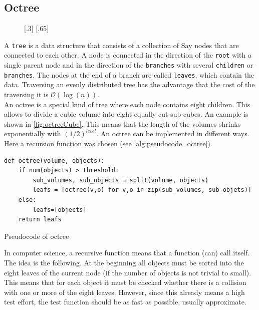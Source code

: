 \subsection{Octree}
% 
\begin{figure}[!t]
    \centering
    [.3\textwidth]{
    \def\tikzheight{0.6\textwidth}
    }
    [.65\textwidth]{
    \def\tikzheight{0.6\textwidth}
    }
	\caption{}
	\label{fig:octree}
\end{figure}
% 
A \texttt{tree} is a data structure that consists of a collection of Say nodes that are connected to each other.
A node is connected in the direction of the \texttt{root} with a single parent node and in the direction of the \texttt{branches} with several \texttt{children} or \texttt{branches}.
The nodes at the end of a branch are called \texttt{leaves}, which contain the data.
Traversing an evenly distributed tree has the advantage that the cost of the traversing it is $\mathcal{O}(\log(n))$.
\\
% 
An octree is a special kind of tree where each node contains eight children.
This allows to divide a cubic volume into eight equally cut sub-cubes.
An example is shown in \cref{fig:octreeCube}.
This means that the length of the volumes shrinks exponentially with $(1/2)^\mathit{level}$.
An octree can be implemented in different ways.
Here a recursion function was chosen (see \cref{alg:pseudocode_octree}).
% 
\begin{lstfloat}[!tb]
\lstset{style=python}
\begin{lstlisting}[]
def octree(volume, objects):
    if num(objects) > threshold:
        sub_volumes, sub_objects = split(volume, objects)
        leafs = [octree(v,o) for v,o in zip(sub_volumes, sub_objets)]
    else:
        leafs=[objects]
    return leafs
\end{lstlisting}
\caption{Pseudocode of octree}
\label{alg:pseudocode_octree}
\end{lstfloat}
% 
In computer science, a recursive function means that a function (can) call itself.
The idea is the following.
At the beginning all objects must be sorted into the eight leaves of the current node (if the number of objects is not trivial to small).
This means that for each object it must be checked whether there is a collision with one or more of the eight leaves.
However, since this already means a high test effort, the test function should be as fast as possible, usually approximate.

